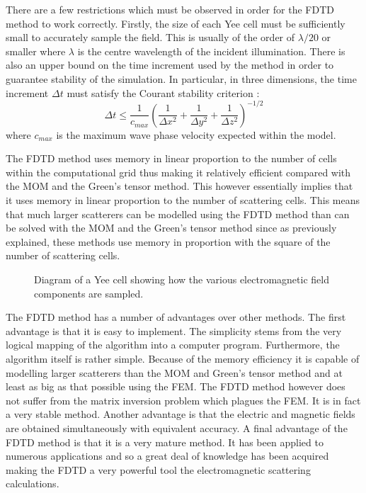 \documentclass[a4paper, 12pt]{article}
\begin{document}
	There are a few restrictions which must be observed in order for the
	FDTD method to work correctly. Firstly, the size of each Yee cell must
	be sufficiently small to accurately sample the field. This is usually
	of the order of $\lambda/20$ or smaller where $\lambda$ is the centre
	wavelength of the incident illumination. There is also an upper bound
	on the time increment used by the method in order to guarantee
	stability of the simulation. In particular, in three dimensions, the
	time increment $\Delta t$ must satisfy the Courant stability criterion \cite{taflove75ieeetransmicrotheoryandtech623}:
	\begin{equation}
		\Delta t \leq \frac{1}{c_{max}}\left(\frac{1}{\Delta x^2} + \frac{1}{\Delta y^2} + \frac{1}{\Delta z^2}\right)^{-1/2}
		\label{eq:numermeth:courant}
	\end{equation}
	where $c_{max}$ is the maximum wave phase velocity expected within
	the model. 
	
	The FDTD method uses memory in linear
	proportion to the number of cells within the computational grid thus
	making it relatively efficient compared with the
	MOM and the Green's tensor method. This however essentially
	implies that it uses memory in linear proportion to the number of
	scattering cells. This means that much larger scatterers can be
	modelled using the FDTD method than can be solved with the MOM and the
	Green's tensor method since as previously explained, these methods use
	memory in proportion with the square of the number of scattering cells.
	
	\begin{figure}[!h]
		\centering
		\caption{Diagram of a Yee cell \cite{yee66ieeetransantprop302,taflove75ieeetransmicrotheoryandtech623} showing how the various electromagnetic field
			components are sampled.}
		\label{fig:numermeth:yeediag}
	\end{figure}
	
	The FDTD method has a number of advantages over other methods. The
	first advantage is that it is easy to implement. The simplicity stems
	from the very logical mapping of the algorithm into a computer
	program. Furthermore, the algorithm itself is rather simple. Because
	of the memory efficiency it is
	capable of modelling larger scatterers than the MOM and Green's tensor
	method and at least as big
	as that possible using the FEM. The FDTD method however does not
	suffer from the matrix inversion problem which plagues the FEM. It is
	in fact a very stable method. Another advantage is that the electric
	and magnetic fields are obtained simultaneously with equivalent
	accuracy. A final advantage of the FDTD method is
	that it is a very mature method. It has been applied to numerous
	applications
	\cite{taflove75ieeetransmicrotheoryandtech888,kunz78ieeetransemc328,taflove80ieeetransemc191,sullivan88ieeetransbiomedeng179,joseph91opticsletters31}
	and so a great deal of knowledge has been acquired making the FDTD a
	very powerful tool the electromagnetic scattering calculations.
	
\end{document}
